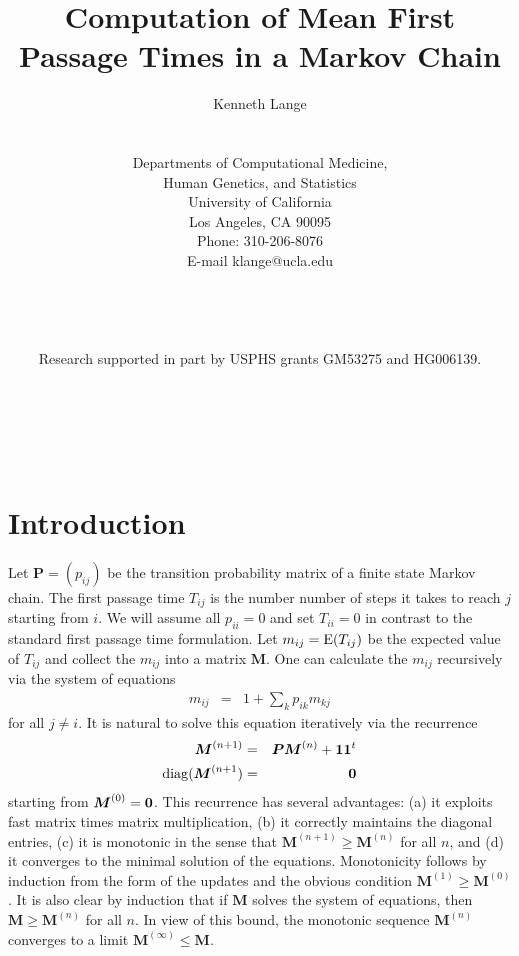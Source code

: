 \documentclass[11pt]{article}
\title{Computation of Mean First Passage Times in a Markov Chain}
\author{Kenneth Lange
\\
\\
\\
Departments of Computational Medicine, \\
Human Genetics, and Statistics \\
University of California \\
Los Angeles, CA 90095\\
Phone: 310-206-8076 \\
E-mail klange@ucla.edu \\
\\
\\
\\
\\
Research supported in part by USPHS grants GM53275 and HG006139.}
\newcommand{\lvskip}{\vspace{.5in}}
\def\E{\mathop{\rm E\,\!}\nolimits}
\def\diag{\mathop{\rm diag}\nolimits}
\newcommand{\bM}{\boldsymbol{M}}
\newcommand{\bP}{\boldsymbol{P}}
\begin{document}
\maketitle

\noindent  \\ \\
\lvskip


\newpage
{}

\baselineskip=20pt

\section*{\center Introduction}

Let $\bP=(p_{ij})$ be the transition probability matrix of a finite
state Markov chain. The first passage time $T_{ij}$ is the number
number of steps it takes to reach $j$ starting from $i$. We will
assume all $p_{ii} =0$ and set $T_{ii}=0$ in contrast to the standard first passage time formulation. Let $m_{ij}=\E(T_{ij})$ be the expected value of $T_{ij}$ and collect the $m_{ij}$
into a matrix $\bM$. One can calculate the $m_{ij}$ recursively via
the system of equations
\begin{eqnarray*}
m_{ij} & = & 1 + \sum_{k}p_{ik}m_{kj}
\end{eqnarray*}
for all $j\ne i$. It is natural to solve this equation iteratively via the recurrence
\begin{eqnarray}
\bM^{(n+1)} & = & \bP\bM^{(n)} + {\bf 1} {\bf 1}^t \label{mean_recur}\\
\diag(\bM^{(n+1}) & = & {\bf 0} \nonumber 
\end{eqnarray}
starting from $\bM^{(0)}={\bf 0}$. This recurrence has several
advantages: (a) it exploits fast matrix times matrix multiplication,
(b) it correctly maintains the diagonal entries, (c) it is monotonic in the sense that $\bM^{(n+1)} \ge \bM^{(n)}$ for all $n$, and (d) it converges to the minimal solution of the equations. Monotonicity follows by induction from the form of the updates and the
obvious condition $\bM^{(1)} \ge \bM^{(0)}$. It is also clear by induction that if $\bM$ solves the system of equations, then $\bM \ge \bM^{(n)}$ for all $n$. In view of this bound, the monotonic sequence 
$\bM^{(n)}$ converges to a limit $\bM^{(\infty)} \le \bM$.
\end{document}
